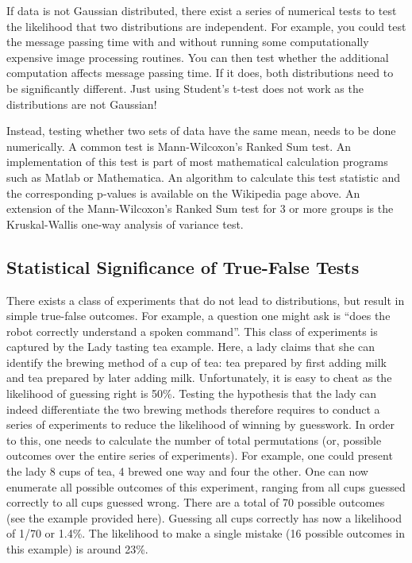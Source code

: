 If data is not Gaussian distributed, there exist a series of numerical tests to test the likelihood that two distributions are independent. For example, you could test the message passing time with and without running some computationally expensive image processing routines. You can then test whether the additional computation affects message passing time. If it does, both distributions need to be significantly different. Just using Student's t-test does not work as the distributions are not Gaussian!

Instead, testing whether two sets of data have the same mean, needs to be done numerically. A common test is Mann-Wilcoxon's Ranked Sum test. An implementation of this test is part of most mathematical calculation programs such as Matlab or Mathematica. An algorithm to calculate this test statistic and the corresponding p-values is available on the Wikipedia page above. An extension of the Mann-Wilcoxon's Ranked Sum test for 3 or more groups is the Kruskal-Wallis one-way analysis of variance test.

\subsection{Statistical Significance of True-False Tests}
There exists a class of experiments that do not lead to distributions, but result in simple true-false outcomes. For example, a question one might ask is ``does the robot correctly understand a spoken command''. This class of experiments is captured by the Lady tasting tea example. Here, a lady claims that she can identify the brewing method of a cup of tea: tea prepared by first adding milk and tea prepared by later adding milk. Unfortunately, it is easy to cheat as the likelihood of guessing right is 50\%. Testing the hypothesis that the lady can indeed differentiate the two brewing methods therefore requires to conduct a series of experiments to reduce the likelihood of winning by guesswork. In order to this, one needs to calculate the number of total permutations (or, possible outcomes over the entire series of experiments). For example, one could present the lady 8 cups of tea, 4 brewed one way and four the other. One can now enumerate all possible outcomes of this experiment, ranging from all cups guessed correctly to all cups guessed wrong. There are a total of 70 possible outcomes (see the example provided here). Guessing all cups correctly has now a likelihood of 1/70 or 1.4\%. The likelihood to make a single mistake (16 possible outcomes in this example) is around 23\%.

